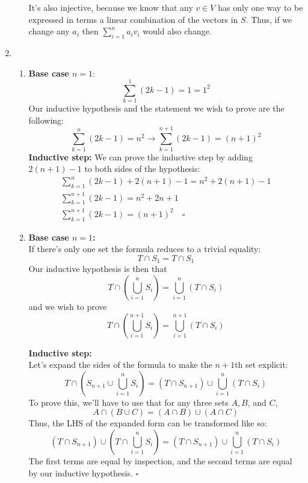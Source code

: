 \documentclass[12pt]{article}
\begin{document}
\begin{enumerate}
\begin{enumerate}
              It's also injective, because we know that any $v \in V$ has only one way to be
              expressed in terms a linear combination of the vectors in $S$.
              Thus, if we change any $a_i$ then $\sum_{i=1}^n a_i v_i$ would also change.
          \end{enumerate}
    \item \begin{enumerate}
              \item \textbf{Base case $n=1$}: \[\sum_{k=1}^1 (2k-1)=1=1^2\]
                    Our inductive hypothesis and the statement we wish to prove are the following:
                    \[\sum_{k=1}^n (2k-1)=n^2 \rightarrow \sum_{k=1}^{n+1} (2k-1)=(n+1)^2\]
                    \textbf{Inductive step:}
                    We can prove the inductive step by adding $2(n+1)-1$ to both sides of the hypothesis:
                    \begin{gather*}
                        \sum_{k=1}^n (2k-1)+2(n+1)-1=n^2+2(n+1)-1 \\
                        \sum_{k=1}^{n+1} (2k-1)=n^2+2n+1 \\
                        \sum_{k=1}^{n+1} (2k-1)=(n+1)^2\quad\square
                    \end{gather*}
              \item \textbf{Base case $n=1$:} \\
              If there's only one set the formula reduces to a trivial equality:
              \[T \cap S_1=T \cap S_1\]
              Our inductive hypothesis is then that
              \[T \cap \left(\bigcup_{i=1}^n S_i\right)=\bigcup_{i=1}^n (T \cap S_i)\]
              and we wish to prove
              \[T \cap \left(\bigcup_{i=1}^{n+1} S_i\right)=\bigcup_{i=1}^{n+1} (T \cap S_i)\]

              \textbf{Inductive step:} \\
              Let's expand the sides of the formula to make the $n+1$th set explicit:
              \[T \cap \left(S_{n+1} \cup \bigcup_{i=1}^n S_i\right)=(T \cap S_{n+1}) \cup \bigcup_{i=1}^n (T \cap S_i)\]
              To prove this, we'll have to use that for any three sets $A,B$, and $C$,
              \[A \cap (B \cup C)=(A \cap B) \cup (A \cap C)\]
              Thus, the LHS of the expanded form can be transformed like so:
              \[(T \cap S_{n+1}) \cup \left(T \cap \bigcup_{i=1}^n S_i\right)=(T \cap S_{n+1}) \cup \bigcup_{i=1}^n (T \cap S_i)\]
              The first terms are equal by inspection, and the second terms are equal by our inductive hypothesis. $\square$
          \end{enumerate}
\end{enumerate}
\end{document}
